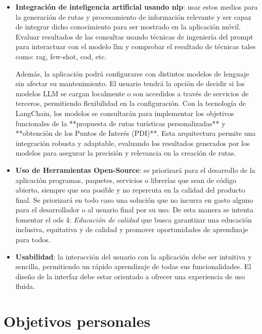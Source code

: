 \begin{itemize}
	\item \textbf{Integración de inteligencia artificial usando \acrfull{nlp}}: usar estos medios para la generación de rutas y procesamiento de información relevante y ser capaz de integrar dicho conocimiento para ser mostrado en la aplicación móvil. Evaluar resultados de las consultas usando técnicas de ingeniería del prompt para interactuar con el modelo \acrshort{llm} y comprobar el resultado de técnicas tales como: \acrfull{rag}, few-shot, \acrfull{cod}, etc. 

	
	Además, la aplicación podrá configurarse con distintos modelos de lenguaje sin afectar su mantenimiento. El usuario tendrá la opción de decidir si los modelos LLM se cargan localmente o son accedidos a través de servicios de terceros, permitiendo flexibilidad en la configuración. Con la tecnología de LangChain, los modelos se consultarán para implementar los objetivos funcionales de la **propuesta de rutas turísticas personalizadas** y **obtención de los Puntos de Interés (PDI)**. Esta arquitectura permite una integración robusta y adaptable, evaluando los resultados generados por los modelos para asegurar la precisión y relevancia en la creación de rutas.
    \item \textbf{Uso de Herramientas Open-Source}: se priorizará para el desarrollo de la aplicación programas, paquetes, servicios o librerías que sean de código abierto, siempre que sea posible y no repercuta en la calidad del producto final. Se priorizará en todo caso una solución que no incurra en gasto alguno para el desarrollador o al usuario final por su uso. De esta manera se intenta fomentar el \acrshort{ods} 4: \textit{Educación de calidad} que busca garantizar una educación inclusiva, equitativa y de calidad y promover oportunidades de aprendizaje para todos.
    \item \textbf{Usabilidad}: la interacción del usuario con la aplicación debe ser intuitiva y sencilla, permitiendo un rápido aprendizaje de todas sus funcionalidades. El diseño de la interfaz debe estar orientado a ofrecer una experiencia de uso fluida.
\end{itemize}

\section{Objetivos personales}


